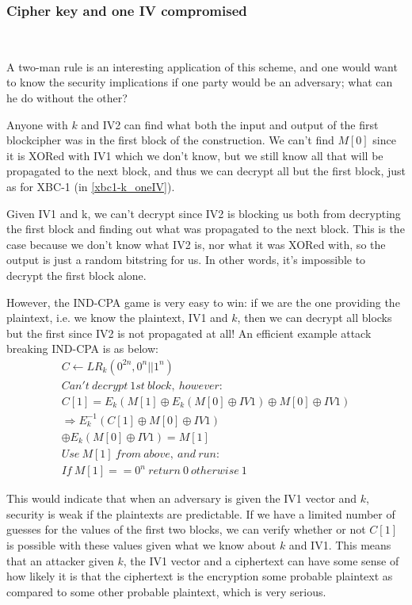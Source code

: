 \documentclass[conference]{IEEEtran}
\begin{document}
\subsubsection{Cipher key and one IV compromised} \

A two-man rule is an interesting application of this scheme, and one would want to know the security implications if one party would be an adversary; what can he do without the other? \

Anyone with $k$ and IV2 can find what both the input and output of the first blockcipher was in the first block of the construction. We can't find $M[0]$ since it is XORed with IV1 which we don't know, but we still know all that will be propagated to the next block, and thus we can decrypt all but the first block, just as for XBC-1 (in \ref{xbc1-k_oneIV}). \

Given IV1 and k, we can't decrypt since IV2 is blocking us both from decrypting the first block and finding out what was propagated to the next block. This is the case because we don't know what IV2 is, nor what it was XORed with, so the output is just a random bitstring for us. In other words, it's impossible to decrypt the first block alone. \

However, the IND-CPA game is very easy to win: if we are the one providing the plaintext, i.e. we know the plaintext, IV1 and $k$, then we can decrypt all blocks but the first since IV2 is not propagated at all! An efficient example attack breaking IND-CPA is as below:
\begin{gather*}
  C \leftarrow LR_k(0^{2n},0^n || 1^n) \\
  Can't\ decrypt\ 1st\ block,\ however: \\
  C[1] = E_k(M[1] \oplus E_k(M[0] \oplus IV1) \oplus M[0] \oplus IV1) \\
  \Rightarrow E_k^{-1}(C[1] \oplus M[0] \oplus IV1) \\
  \oplus E_k(M[0] \oplus IV1) = M[1] \\
  Use\ M[1]\ from\ above,\ and\ run: \\
  If\ M[1]==0^n\ return\ 0\ otherwise\ 1
\end{gather*}

This would indicate that when an adversary is given the IV1 vector and $k$, security is weak if the plaintexts are predictable. If we have a limited number of guesses for the values of the first two blocks, we can verify whether or not $C[1]$ is possible with these values given what we know about $k$ and IV1. This means that an attacker given $k$, the IV1 vector and a ciphertext can have some sense of how likely it is that the ciphertext is the encryption some probable plaintext as compared to some other probable plaintext, which is very serious.
\end{document}
